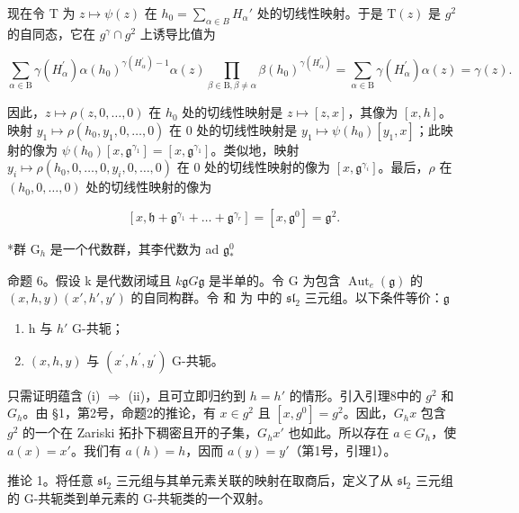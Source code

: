 现在令 T 为 \(z \mapsto \psi(z)\) 在 \(h_{0} = \sum_{\alpha \in B} H_{\alpha}'\) 处的切线性映射。于是 \(\mathrm{T}(z)\) 是 \(g^{2}\) 的自同态，它在 \(g^{\gamma} \cap g^{2}\) 上诱导比值为

\[
\sum_ {\alpha \in \mathrm{B}} \gamma (H _ {\alpha} ^ {\prime}) \alpha (h _ {0}) ^ {\gamma (H _ {\alpha} ^ {\prime}) - 1} \alpha (z) \prod_ {\beta \in \mathrm{B}, \beta \neq \alpha} \beta (h _ {0}) ^ {\gamma (H _ {\alpha} ^ {\prime})} = \sum_ {\alpha \in \mathrm{B}} \gamma (H _ {\alpha} ^ {\prime}) \alpha (z) = \gamma (z).
\]

因此，\(z \mapsto \rho(z,0,\ldots,0)\) 在 \(h_{0}\) 处的切线性映射是 \(z \mapsto [z,x]\)，其像为 \([x,h]\)。映射 \(y_{1} \mapsto \rho(h_{0},y_{1},0,\ldots,0)\) 在 0 处的切线性映射是 \(y_{1} \mapsto \psi(h_{0})[y_{1},x]\)；此映射的像为 \(\psi(h_{0})[x,\mathfrak{g}^{\gamma_{1}}] = [x,\mathfrak{g}^{\gamma_{1}}]\)。类似地，映射 \(y_{i} \mapsto \rho(h_{0},0,\ldots,0,y_{i},0,\ldots,0)\) 在 0 处的切线性映射的像为 \([x,\mathfrak{g}^{\gamma_{i}}]\)。最后，\(\rho\) 在 \((h_{0},0,\ldots,0)\) 处的切线性映射的像为

\[
[ x, \mathfrak {h} + \mathfrak {g} ^ {\gamma_ {1}} + \dots + \mathfrak {g} ^ {\gamma_ {r}} ] = [ x, \mathfrak {g} ^ {0} ] = \mathfrak {g} ^ {2}.\tag{Q.E.D.}
\]

*群 \(\mathrm{G}_h\) 是一个代数群，其李代数为 ad \(\mathfrak{g}^0_*\)

命题 6。假设 k 是代数闭域且 \(k\)\(\mathfrak{g}\)\(G\)\(\mathfrak{g}\) 是半单的。令 G 为包含 \(\operatorname{Aut}_e(\mathfrak{g})\) 的 \((x, h, y)\)\((x', h', y')\) 的自同构群。令  和  为  中的 \(\mathfrak{sl}_2\) 三元组。以下条件等价：\(\mathfrak{g}\)

\begin{enumerate}
\def\labelenumi{(\roman{enumi})}
\item
  h 与 \(h'\) G-共轭；
\item
  \((x,h,y)\) 与 \((x^{\prime},h^{\prime},y^{\prime})\) G-共轭。
\end{enumerate}

只需证明蕴含 (i) \(\Longrightarrow\) (ii)，且可立即归约到 \(h = h'\) 的情形。引入引理8中的 \(g^{2}\) 和 \(G_{h}\)。由 §1，第2号，命题2的推论，有 \(x \in g^{2}\) 且 \([x, g^{0}] = g^{2}\)。因此，\(G_{h}x\) 包含 \(g^{2}\) 的一个在 Zariski 拓扑下稠密且开的子集，\(G_{h}x'\) 也如此。所以存在 \(a \in G_{h}\)，使 \(a(x) = x'\)。我们有 \(a(h) = h\)，因而 \(a(y) = y'\)（第1号，引理1）。

推论 1。将任意 \(\mathfrak{sl}_2\) 三元组与其单元素关联的映射在取商后，定义了从 \(\mathfrak{sl}_2\) 三元组的 G-共轭类到单元素的 G-共轭类的一个双射。

